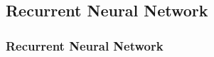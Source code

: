 \subsection{Recurrent Neural Network}

\begin{frame}
\frametitle{Recurrent Neural Network}
\blindtext
\end{frame}
